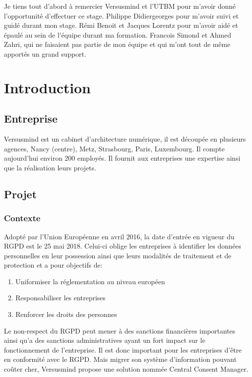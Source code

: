 \documentclass[12pt, a4paper]{report}
\newcommand\tab[1][1cm]{\hspace*{#1}}
\begin{document}
	\makeutbmfrontcover{}
        Je tiens tout d'abord à remercier Versusmind et l'UTBM pour m'avoir donné l'opportunité d'effectuer ce stage.\newline\newline
        Philippe Didiergeorges pour m'avoir suivi et guidé durant mon stage.\newline\newline
        Rémi Benoit et Jacques Lorentz pour m'avoir aidé et épaulé au sein de l'équipe durant ma formation.\newline\newline
        Francois Simond et Ahmed Zahri, qui ne faisaient pas partie de mon équipe et qui m'ont tout de même apportés un grand support.
    \newpage
    \tableofcontents
    \chapter{Introduction}
        \section{Entreprise}
            \tab{} Versusmind est un cabinet d'architecture numérique, il est découpée en plusieurs agences, Nancy (centre), Metz, Strasbourg, Paris, Luxembourg.\newline
            Il compte aujourd'hui environ 200 employés. Il fournit aux entreprises une expertise ainsi que la réalisation leurs projets.
        \section{Projet}
            \subsection{Contexte}
                \tab{} Adopté par l’Union Européenne en avril 2016, la date d’entrée en vigueur du RGPD est le 25 mai 2018. Celui-ci oblige les entreprises à identifier les données personnelles en leur possession ainsi que leurs modalités de traitement et de protection et a pour objectifs de\@:
                \begin{enumerate}
                    \item Uniformiser la réglementation au niveau européen
                    \item Responsabiliser les entreprises
                    \item Renforcer les droits des personnes
                \end{enumerate}
                \tab{} Le non-respect du RGPD peut mener à des sanctions financières importantes ainsi qu'a des sanctions administratives ayant un fort impact sur le fonctionnement de l'entreprise.
                Il est donc important pour les entreprises d'être en conformité avec le RGPD.\newline
                Mais migrer son système d'information pouvant coûter cher, Versusmind propose une solution nommée Central Consent Manager.
\end{document}
